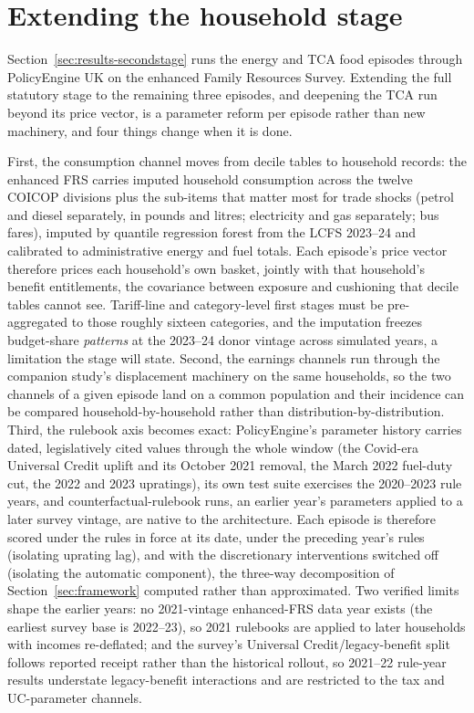 \section{Extending the household stage}\label{sec:roadmap}

Section~\ref{sec:results-secondstage} runs the energy and TCA food
episodes through PolicyEngine UK on the enhanced Family Resources
Survey. Extending the full statutory stage to the remaining three
episodes, and deepening the TCA run beyond its price vector, is a
parameter reform per episode rather than new machinery, and four
things change when it is done.

First, the consumption channel moves from decile tables to household
records: the enhanced FRS carries imputed household consumption across
the twelve COICOP divisions plus the sub-items that matter most for
trade shocks (petrol and diesel separately, in pounds and litres;
electricity and gas separately; bus fares), imputed by quantile
regression forest from the LCFS 2023--24 and calibrated to
administrative energy and fuel totals. Each episode's price vector
therefore prices each household's own basket, jointly with that
household's benefit entitlements, the covariance between exposure and
cushioning that decile tables cannot see. Tariff-line and
category-level first stages must be pre-aggregated to those roughly
sixteen categories, and the imputation freezes budget-share
\emph{patterns} at the 2023--24 donor vintage across simulated years, a
limitation the stage will state. Second, the earnings channels run through the companion study's
displacement machinery on the same households, so the two channels of a
given episode land on a common population and their incidence can be
compared household-by-household rather than distribution-by-distribution. Third, the rulebook axis becomes exact: PolicyEngine's parameter
history carries dated, legislatively cited values through the whole
window (the Covid-era Universal Credit uplift and its October 2021
removal, the March 2022 fuel-duty cut, the 2022 and 2023 upratings),
its own test suite exercises the 2020--2023 rule years, and
counterfactual-rulebook runs, an earlier year's parameters applied to
a later survey vintage, are native to the architecture. Each episode
is therefore scored under the rules in force at its date, under the
preceding year's rules (isolating uprating lag), and with the
discretionary interventions switched off (isolating the automatic
component), the three-way decomposition of
Section~\ref{sec:framework} computed rather than approximated. Two
verified limits shape the earlier years: no 2021-vintage enhanced-FRS
data year exists (the earliest survey base is 2022--23), so 2021
rulebooks are applied to later households with incomes re-deflated;
and the survey's Universal Credit/legacy-benefit split follows
reported receipt rather than the historical rollout, so 2021--22
rule-year results understate legacy-benefit interactions and are
restricted to the tax and UC-parameter channels.


